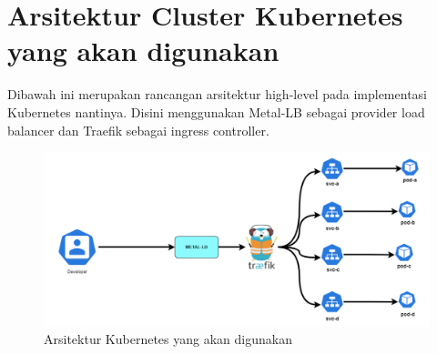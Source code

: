 \section{Arsitektur Cluster Kubernetes yang akan digunakan}
Dibawah ini merupakan rancangan arsitektur high-level pada implementasi Kubernetes
nantinya. Disini menggunakan Metal-LB sebagai provider load balancer dan Traefik sebagai ingress controller.
\begin{figure}[h]
    \centering
    \includegraphics[width=1\textwidth]{figures/kubernetes-arch.png}
    \caption{Arsitektur Kubernetes yang akan digunakan}
\end{figure}
\newpage